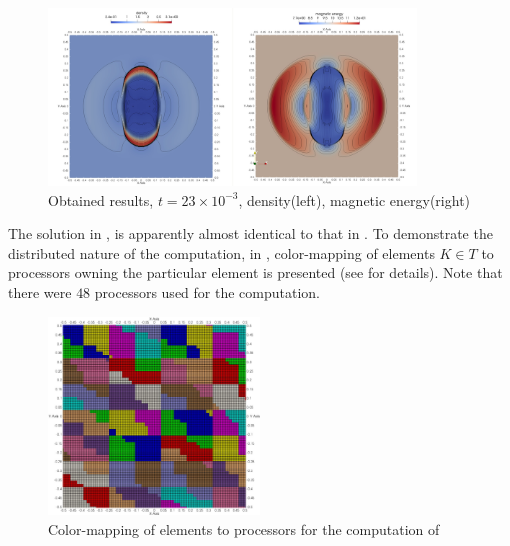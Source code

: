 \begin{figure}[H]
	\begin{center}
		\includegraphics[width=0.87\textwidth]{img//mhd-blast/old/mynew5.jpg}
	\caption{Obtained results, $t = 23\times 10^{-3}$, density(left), magnetic energy(right)}
	\label{figure:blastOldMy5}
	\end{center}
\end{figure}
\vspace{-5mm}
The solution in ,   is apparently almost identical to that in . To demonstrate the distributed nature of the computation, in , color-mapping of elements $K \in T$ to processors owning the particular element is presented (see  for details). Note that there were $48$ processors used for the computation.

\begin{figure}[H]
	\begin{center}
		\includegraphics[width=0.5\textwidth]{img//mhd-blast/old/subdomain.jpg}
	\caption{Color-mapping of elements to processors for the computation of }
	\label{figure:subdomainsBlastOld}
	\end{center}
\end{figure}
\vspace{-5mm}

